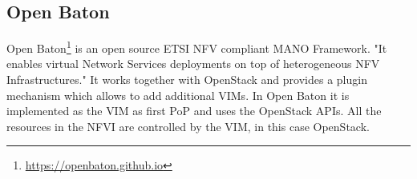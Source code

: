 

\subsection{Open Baton}
Open Baton\footnote{\url{https://openbaton.github.io}} is an open source \ac{ETSI} \ac{NFV} compliant \ac{MANO} Framework\cite[cf.]{openBatonDoc}.
"It enables virtual Network Services deployments on top of heterogeneous \ac{NFV} Infrastructures."\autocite{openBatonDoc}
It works together with OpenStack and provides a plugin mechanism which allows to add additional \acp{VIM}.\cite[cf.]{openBatonDoc}
In Open Baton it is implemented as the \ac{VIM} as first \ac{PoP} and uses the OpenStack \acp{API}.\autocite{openBatonDoc}
All the resources in the \ac{NFVI} are controlled by the \ac{VIM}, in this case OpenStack.

